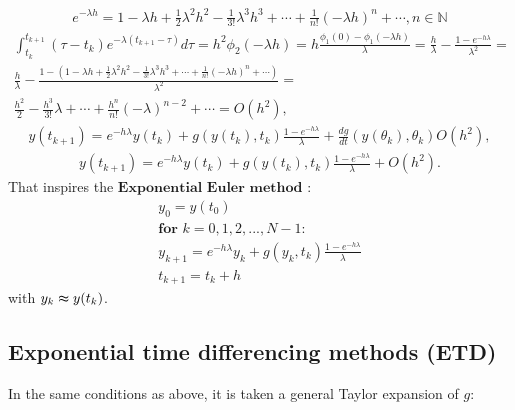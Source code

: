 \documentclass[letterpaper,10pt,english]{jupyterBook}
\begin{document}
\begin{equation*}
\begin{split}
    e^{-\lambda h} = 1 - \lambda h + \frac{1}{2}\lambda^2h^2 - \frac{1}{3!}\lambda^3h^3 + \dotsi + \frac{1}{n!} (-\lambda h)^n + \dotsi, n \in \mathbb{N}
\end{split}
\end{equation*}\begin{equation*}
\begin{split}
     \int_{t_k}^{t_{k+1}} (\tau - t_k) e^{-\lambda(t_{k+1}-\tau)} d\tau =
     h^2 \phi_2 (-\lambda h) =
     h \frac{\phi_1(0) - \phi_1(-\lambda h)}{\lambda} =
     \frac{h}{\lambda} - \frac{1-e^{-h \lambda}}{\lambda^2} = \\
     \frac{h}{\lambda} - \frac{1-(1 - \lambda h + \frac{1}{2}\lambda^2h^2 - \frac{1}{3!}\lambda^3h^3 + \dotsi + \frac{1}{n!} (-\lambda h)^n + \dotsi)}{\lambda^2} = \\
     \frac{h^2}{2} - \frac{h^3}{3!} \lambda + \dotsi + \frac{h^n}{n!} (-\lambda)^{n-2} + \dotsi  =  O(h^2),
\end{split}
\end{equation*}\begin{equation*}
\begin{split}
    y(t_{k+1}) = e^{-h \lambda}y(t_k) + g(y(t_k), t_k) \frac{1-e^{-h \lambda}}{\lambda} + \frac{dg}{dt} (y(\theta_k), \theta_k) O(h^2),
\end{split}
\end{equation*}\begin{equation*}
\begin{split}
  y(t_{k+1}) = e^{-h \lambda}y(t_k) + g(y(t_k), t_k) \frac{1-e^{-h \lambda}}{\lambda} + O(h^2).
\end{split}
\end{equation*}
\sphinxAtStartPar
That inspires the \(\textbf{Exponential Euler method}\) :
\begin{equation*}
\begin{split}
y_0 = y(t_0)\\
\textbf{for } k = 0, 1, 2, ..., N-1 :\\
    y_{k+1} = e^{-h \lambda}y_k + g(y_k, t_k) \frac{1-e^{-h \lambda}}{\lambda}\\
    t_{k+1} = t_k + h
\end{split}
\end{equation*}
\sphinxAtStartPar
with \(y_k \thickapprox y(t_k)\).


\subsection{Exponential time differencing methods (ETD)}
\label{\detokenize{appendix:exponential-time-differencing-methods-etd}}
\sphinxAtStartPar
In the same conditions as above, it is taken a general Taylor expansion of \(g\):
\end{document}
